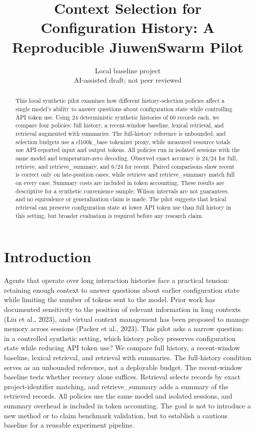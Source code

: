 \documentclass{article}
\author{Local baseline project\\AI-assisted draft; not peer reviewed}
\title{Context Selection for Configuration History: A Reproducible JiuwenSwarm Pilot}
\begin{document}
\maketitle
{}
\begin{abstract}
This local synthetic pilot examines how different history-selection policies affect a single model's ability to answer questions about configuration state while controlling API token use. Using 24 deterministic synthetic histories of 60 records each, we compare four policies: full history, a recent-window baseline, lexical retrieval, and retrieval augmented with summaries. The full-history reference is unbounded, and selection budgets use a cl100k\_base tokenizer proxy, while measured resource totals use API-reported input and output tokens. All policies run in isolated sessions with the same model and temperature-zero decoding. Observed exact accuracy is 24/24 for full, retrieve, and retrieve\_summary, and 6/24 for recent. Paired comparisons show recent is correct only on late-position cases, while retrieve and retrieve\_summary match full on every case. Summary costs are included in token accounting. These results are descriptive for a synthetic convenience sample; Wilson intervals are not guarantees, and no equivalence or generalization claim is made. The pilot suggests that lexical retrieval can preserve configuration state at lower API token use than full history in this setting, but broader evaluation is required before any research claim.
\end{abstract}
\section{Introduction}
Agents that operate over long interaction histories face a practical tension: retaining enough context to answer questions about earlier configuration state while limiting the number of tokens sent to the model. Prior work has documented sensitivity to the position of relevant information in long contexts (Liu et al., 2023), and virtual context management has been proposed to manage memory across sessions (Packer et al., 2023). This pilot asks a narrow question: in a controlled synthetic setting, which history policy preserves configuration state while reducing API token use? We compare full history, a recent-window baseline, lexical retrieval, and retrieval with summaries. The full-history condition serves as an unbounded reference, not a deployable budget. The recent-window baseline tests whether recency alone suffices. Retrieval selects records by exact project-identifier matching, and retrieve\_summary adds a summary of the retrieved records. All policies use the same model and isolated sessions, and summary overhead is included in token accounting. The goal is not to introduce a new method or to claim benchmark validation, but to establish a cautious baseline for a reusable experiment pipeline.
\end{document}
